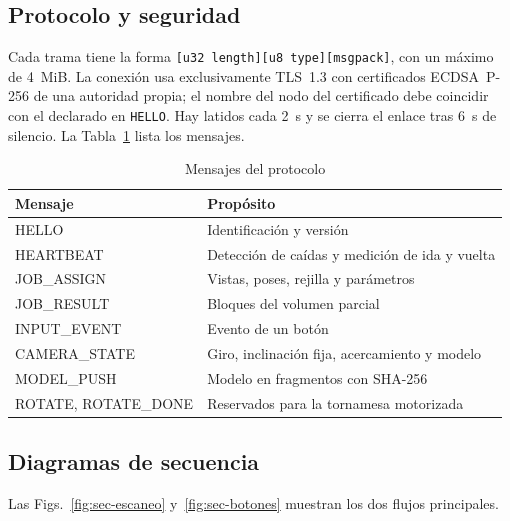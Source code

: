 \documentclass[journal]{IEEEtran}
\begin{document}
\subsection{Protocolo y seguridad}
Cada trama tiene la forma \texttt{[u32 length][u8 type][msgpack]}, con un máximo
de 4~MiB. La conexión usa exclusivamente TLS~1.3 con certificados ECDSA~P-256 de
una autoridad propia; el nombre del nodo del certificado debe coincidir con el
declarado en \texttt{HELLO}. Hay latidos cada 2~s y se cierra el enlace tras 6~s
de silencio. La Tabla~\ref{tab:mensajes} lista los mensajes.

\begin{table}[!t]
\caption{Mensajes del protocolo}
\label{tab:mensajes}
\centering
\footnotesize
\begin{tabularx}{\columnwidth}{lX}
\toprule
\textbf{Mensaje} & \textbf{Propósito}\\
\midrule
HELLO & Identificación y versión\\
HEARTBEAT & Detección de caídas y medición de ida y vuelta\\
JOB\_ASSIGN & Vistas, poses, rejilla y parámetros\\
JOB\_RESULT & Bloques del volumen parcial\\
INPUT\_EVENT & Evento de un botón\\
CAMERA\_STATE & Giro, inclinación fija, acercamiento y modelo\\
MODEL\_PUSH & Modelo en fragmentos con SHA-256\\
ROTATE, ROTATE\_DONE & Reservados para la tornamesa motorizada\\
\bottomrule
\end{tabularx}
\end{table}

\subsection{Diagramas de secuencia}
Las Figs.~\ref{fig:sec-escaneo} y~\ref{fig:sec-botones} muestran los dos flujos
principales.
\end{document}
